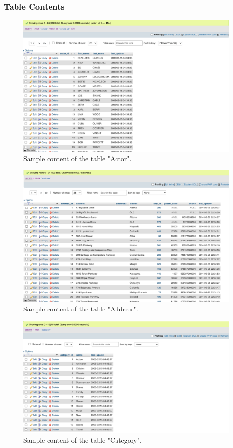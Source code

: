 \documentclass[openany]{article}
\begin{document}
	\subsubsection{Table Contents}
		\begin{figure}[H]
			\includegraphics[width=\textwidth]{actor_content}
			\caption{Sample content of the table "Actor".}
		\end{figure}
		\begin{figure}[H]
			\includegraphics[width=\textwidth]{address_content}
			\caption{Sample content of the table "Address".}
		\end{figure}
		\begin{figure}[H]
			\includegraphics[width=\textwidth]{category_content}
			\caption{Sample content of the table "Category".}
		\end{figure}
\end{document}
